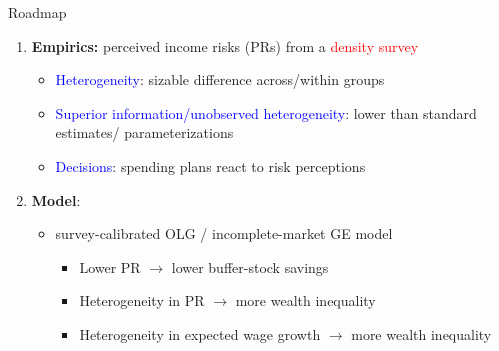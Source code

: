 \documentclass{beamer}
\begin{document}
\begin{frame}{Roadmap}
	\begin{enumerate}
		\item \textbf{Empirics:} perceived income risks (PRs) from a \textcolor{red}{density survey}
		\begin{itemize}
			\item \textcolor{blue}{Heterogeneity}: sizable difference across/within groups
			\item \textcolor{blue}{Superior information/unobserved heterogeneity}: lower than standard estimates/ parameterizations
			\item \textcolor{blue}{Decisions}: spending plans react to risk perceptions
			

		
		\end{itemize}
\pause
		\item \textbf{Model}: 
		\begin{itemize}
			\item survey-calibrated OLG / incomplete-market GE model 
\begin{itemize}
	\item Lower PR $\rightarrow$ lower buffer-stock savings 
	\item Heterogeneity in PR $\rightarrow$ more wealth inequality 
		\item Heterogeneity in expected wage growth $\rightarrow$ more wealth inequality 
\end{itemize}
		\end{itemize} 
	\end{enumerate}
\end{frame}
\end{document}

